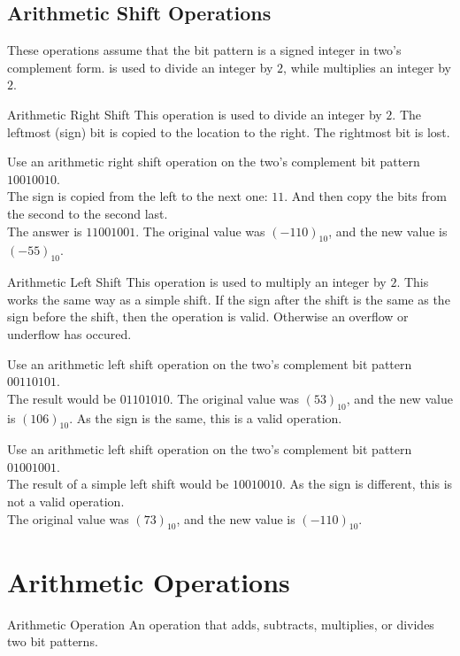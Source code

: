 \documentclass[\main/notes.tex]{subfiles}
\begin{document}
			\subsection{Arithmetic Shift Operations}
				These operations assume that the bit pattern is a signed integer in two's complement form.  is used to divide an integer by $2$, while  multiplies an integer by $2$.
				\begin{definition}{Arithmetic Right Shift}
					This operation is used to divide an integer by $2$. The leftmost (sign) bit is copied to the location to the right. The rightmost bit is lost.
					\begin{example}
						Use an arithmetic right shift operation on the two's complement bit pattern $10010010$.\\
						The sign is copied from the left to the next one: $11$. And then copy the bits from the second to the second last.\\
						The answer is $11001001$. The original value was $(-110)_{10}$, and the new value is $(-55)_{10}$.
					\end{example}
				\end{definition}
				\begin{definition}{Arithmetic Left Shift}
					This operation is used to multiply an integer by $2$. This works the same way as a simple shift. If the sign after the shift is the same as the sign before the shift, then the operation is valid. Otherwise an overflow or underflow has occured.
					\begin{example}
						Use an arithmetic left shift operation on the two's complement bit pattern $00110101$.\\
						The result would be $01101010$. The original value was $(53)_{10}$, and the new value is $(106)_{10}$. As the sign is the same, this is a valid operation.
					\end{example}
					\begin{example}
						Use an arithmetic left shift operation on the two's complement bit pattern $01001001$.\\
						The result of a simple left shift would be $10010010$. As the sign is different, this is not a valid operation.\\
						The original value was $(73)_{10}$, and the new value is $(-110)_{10}$.
					\end{example}
				\end{definition}
		\pagebreak
		\section{Arithmetic Operations}
			\begin{definition}{Arithmetic Operation}
				An operation that adds, subtracts, multiplies, or divides two bit patterns.
			\end{definition}
\end{document}
